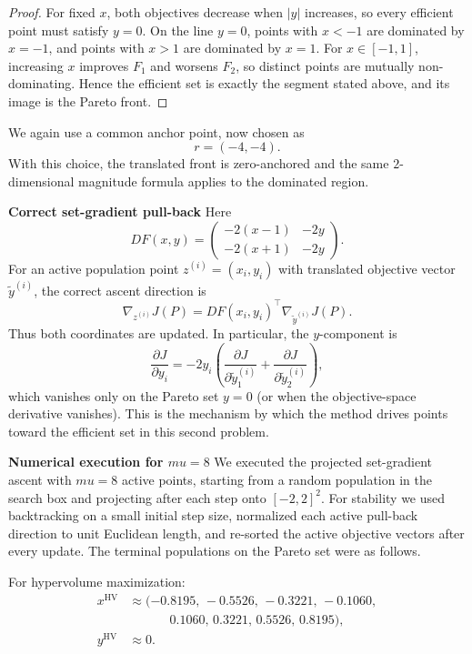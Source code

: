 \documentclass{article}
\def\mu{mu}%
\theoremstyle{definition}
\newcommand{\1}{\mathbf{1}}
\newcommand{\myparagraph}[1]{\medskip\noindent\textbf{#1}}
\begin{document}
\begin{proof}
For fixed $x$, both objectives decrease when $|y|$ increases, so every efficient point must satisfy $y=0$. On the line $y=0$, points with $x<-1$ are dominated by $x=-1$, and points with $x>1$ are dominated by $x=1$. For $x\in[-1,1]$, increasing $x$ improves $F_1$ and worsens $F_2$, so distinct points are mutually non-dominating. Hence the efficient set is exactly the segment stated above, and its image is the Pareto front.
\end{proof}

We again use a common anchor point, now chosen as
\[
r=(-4,-4).
\]
With this choice, the translated front is zero-anchored and the same $2$-dimensional magnitude formula applies to the dominated region.

\myparagraph{Correct set-gradient pull-back}
Here
\[
DF(x,y)=
\begin{pmatrix}
-2(x-1) & -2y\\
-2(x+1) & -2y
\end{pmatrix}.
\]
For an active population point $z^{(i)}=(x_i,y_i)$ with translated objective vector $\widetilde y^{(i)}$, the correct ascent direction is
\[
\nabla_{z^{(i)}}J(P)=DF(x_i,y_i)^\top \nabla_{\widetilde y^{(i)}}J(P).
\]
Thus both coordinates are updated. In particular, the $y$-component is
\[
\frac{\partial J}{\partial y_i}
=
-2y_i\left(\frac{\partial J}{\partial \widetilde y^{(i)}_1}
+
\frac{\partial J}{\partial \widetilde y^{(i)}_2}\right),
\]
which vanishes only on the Pareto set $y=0$ (or when the objective-space derivative vanishes). This is the mechanism by which the method drives points toward the efficient set in this second problem.

\myparagraph{Numerical execution for $\mu=8$}
We executed the projected set-gradient ascent with $\mu=8$ active points, starting from a random population in the search box and projecting after each step onto $[-2,2]^2$. For stability we used backtracking on a small initial step size, normalized each active pull-back direction to unit Euclidean length, and re-sorted the active objective vectors after every update. The terminal populations on the Pareto set were as follows.

For hypervolume maximization:
\[
\begin{aligned}
x^{\mathrm{HV}} &\approx (-0.8195,\,-0.5526,\,-0.3221,\,-0.1060,\\
&\qquad\quad\ 0.1060,\,0.3221,\,0.5526,\,0.8195),\\
y^{\mathrm{HV}}&\approx 0.
\end{aligned}
\]
\end{document}
